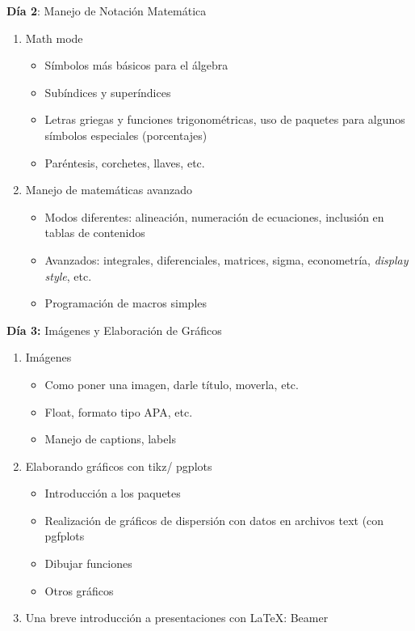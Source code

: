 \documentclass[a4paper]{article}
\begin{document}
\textbf{Día 2}: Manejo de Notación Matemática
\begin{enumerate}
    \item Math mode
    \begin{itemize}
        \item Símbolos más básicos para el álgebra
        \item Subíndices y superíndices
        \item Letras griegas y funciones trigonométricas, uso de paquetes para algunos símbolos especiales (porcentajes)
        \item Paréntesis, corchetes, llaves, etc. 
         \end{itemize}
            \item Manejo de matemáticas avanzado
         \begin{itemize}
               \item Modos diferentes: alineación, numeración de ecuaciones, inclusión en tablas de contenidos
        \item Avanzados: integrales, diferenciales, matrices, sigma, econometría, \textit{display style}, etc.
        \item Programación de macros simples 
     \end{itemize}
\end{enumerate}
\textbf{Día 3:} Imágenes y Elaboración de Gráficos
\begin{enumerate}
    \item Imágenes
    \begin{itemize}
        \item Como poner una imagen, darle título, moverla, etc. 
        \item Float, formato tipo APA, etc. 
        \item Manejo de captions, labels
        \end{itemize}
 \item Elaborando gráficos con \textsf{tikz}/ \textsf{pgplots}
\begin{itemize}
     \item Introducción a los paquetes
 \item Realización de gráficos de dispersión con datos en archivos text (con \textsf{pgfplots}
 \item Dibujar funciones
 \item Otros gráficos
 
\end{itemize}
\item Una breve introducción a presentaciones con \LaTeX: Beamer
\end{enumerate}
\end{document}
